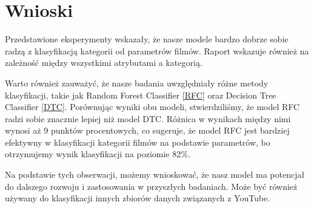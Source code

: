 \section{Wnioski}

Przedstawione eksperymenty wskazały, że nasze modele bardzo dobrze sobie radzą z klasyfikacją kategorii od parametrów filmów. Raport wskazuje również na zależność między wszystkimi atrybutami a kategorią. 

Warto również zauważyć, że nasze badania uwzględniały różne metody klasyfikacji, takie jak Random Forest Classifier \ref{RFC} oraz Decision Tree Classifier \ref{DTC}. Porównując wyniki obu modeli, stwierdziliśmy, że model RFC radzi sobie znacznie lepiej niż model DTC. Różnica w wynikach między nimi wynosi aż 9 punktów procentowych, co sugeruje, że model RFC jest bardziej efektywny w klasyfikacji kategorii filmów na podstawie parametrów, bo otrzymujemy wynik klasyfikacji na poziomie 82\%.

Na podstawie tych obserwacji, możemy wnioskować, że nasz model ma potencjał do dalszego rozwoju i zastosowania w przyszłych badaniach. Może być również używany do klasyfikacji innych zbiorów danych związanych z YouTube.